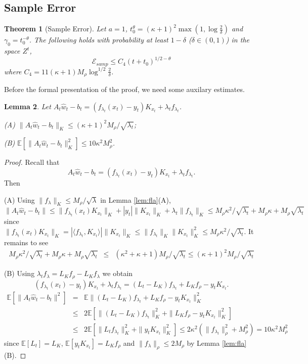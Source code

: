 \documentclass[twoside,11pt]{amsart}
\theoremstyle{theorem}
\newtheorem{thm}{Theorem}[section]
\newtheorem{lem}[thm]{Lemma}
\theoremstyle{definition}
\theoremstyle{remark}
\def\<{{\langle}}
\def\>{{\rangle}}
\def\E{{\mathbb E}}        %
\def\w{\hat{w}}
\def\M{M_\rho}
\def\Err{{\mathscr E}}
\def\t{t_0}
\def\la{\lambda}
\def\ka{\kappa}
\begin{document}
\subsection{Sample Error}

\begin{thm} [Sample Error] \label{err:samp}
Let $a=1$, $\t^\theta=(\kappa+1)^2\max(1,\log \frac{2}{\delta})$ and $\gamma_0 = \t^{-\theta}$. The following holds with probability
at least $1-\delta$ ($\delta\in (0,1)$) in the space $Z^t$,
\[ \Err_{samp} \leq C_4(t+\t)^{1/2-\theta}  \]
where $C_4=11 (\kappa+1) M_\rho \log^{1/2}\frac{2}{\delta}$.
\end{thm}

Before the formal presentation of the proof, we need some auxilary estimates.

\begin{lem} \label{lem:xi} Let $A_t \w_t - b_t=(f_{\lambda_t}(x_t) - y_t) K_{x_t} + \lambda_t f_{\lambda_t}$.

(A) $\|A_t \w_t - b_t\|_K\leq (\ka +1)^2 M_\rho/\sqrt{\lambda_t}$;

(B) $\E[\|A_t \w_t - b_t\|_K^2] \leq 10 \kappa^2 M_\rho^2$.
\end{lem}

\begin{proof}
Recall that
\[ A_t \w_t - b_t=(f_{\lambda_t}(x_t) - y_t) K_{x_t} + \lambda_t f_{\lambda_t}. \]
Then

(A) Using $\|f_\lambda\|_K \leq M_\rho/\sqrt{\lambda}$ in Lemma \ref{lem:fla}(A), 
\[ \|A_t \w_t - b_t\| \leq \|f_{\lambda_t}(x_t) K_{x_t}\|_K + |y_t| \| K_{x_t}\|_K + \lambda_t \|f_{\la_t}\|_K \leq M_\rho \kappa^2 /\sqrt{\lambda_t} + M_\rho \kappa + M_\rho \sqrt{\lambda_t} \]
since $\|f_{\lambda_t}(x_t) K_{x_t}\|_K = |\<f_{\lambda_t}, K_{x_t}\>|\| K_{x_t}\|_K  \leq \|f_{\lambda_t}\|_K \|K_{x_t}\|_K^2 
\leq M_\rho \kappa^2 /\sqrt{\lambda_t}$.
It remains to see
\begin{eqnarray*}
M_\rho \kappa^2 /\sqrt{\lambda_t} + M_\rho \kappa + M_\rho \sqrt{\lambda_t} & \leq & (\kappa^2+\ka +1) M_\rho/\sqrt{\lambda_t} \leq (\ka +1)^2 M_\rho/\sqrt{\lambda_t}
\end{eqnarray*}

(B) Using $\lambda_t f_{\la} = L_K f_\rho - L_K f_{\la}$ we obtain
\[ (f_{\lambda_t}(x_t) - y_t) K_{x_t} + \lambda_t f_{\la_t} = (L_t - L_K)f_{\la_t} +L_K f_\rho- y_t K_{x_t}.   \]
\begin{eqnarray*}
\E[\|A_t \w_t - b_t\|^2] & = &\E \|(L_t - L_K)f_{\la_t} +L_K f_\rho- y_t K_{x_t}\|_K^2 \\
& \leq & 2\E[\|(L_t - L_K)f_{\la_t}\|_K^2 + \|L_K f_\rho- y_t K_{x_t}\|_K^2] \\
& \leq & 2\E[\|L_t f_{\la_t}\|_K^2 +  \|y_t K_{x_t}\|_K^2] \leq 2 \kappa^2 (\|f_{\la_t}\|_\rho^2 + M^2_\rho) = 10 \kappa^2 M^2_\rho 
\end{eqnarray*}
since $\E[L_t] = L_K$, $\E[y_t K_{x_t}] = L_K f_\rho$ and $\|f_\la\|_\rho \leq 2 \M$ by Lemma \ref{lem:fla}(B). 
\end{proof}
\end{document}
